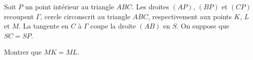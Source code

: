 Soit $P$ un point intérieur au triangle $ABC$. Les droites $(AP)$, $(BP)$ et $(CP)$ recoupent $\Gamma$, cercle
circonscrit au triangle $ABC$, respectivement aux points $K$, $L$ et $M$. La tangente en $C$ à $\Gamma$ coupe
la droite $(AB)$ en $S$. On suppose que $SC = SP$.

Montrer que $MK = ML$.
